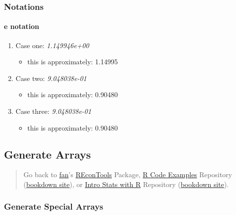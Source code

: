 \documentclass[
]{book}
\providecommand{\tightlist}{%
  \setlength{\itemsep}{0pt}\setlength{\parskip}{0pt}}
\begin{document}
\hypertarget{notations}{%
\subsubsection{Notations}\label{notations}}

\hypertarget{e-notation}{%
\paragraph{e notation}\label{e-notation}}

\begin{enumerate}
\def\labelenumi{\arabic{enumi}.}
\tightlist
\item
  Case one: \emph{1.149946e+00}

  \begin{itemize}
  \tightlist
  \item
    this is approximately: 1.14995
  \end{itemize}
\item
  Case two: \emph{9.048038e-01}

  \begin{itemize}
  \tightlist
  \item
    this is approximately: 0.90480
  \end{itemize}
\item
  Case three: \emph{9.048038e-01}

  \begin{itemize}
  \tightlist
  \item
    this is approximately: 0.90480
  \end{itemize}
\end{enumerate}

\hypertarget{generate-arrays}{%
\subsection{Generate Arrays}\label{generate-arrays}}

\begin{quote}
Go back to \href{http://fanwangecon.github.io/}{fan}'s \href{https://fanwangecon.github.io/REconTools/}{REconTools} Package, \href{https://fanwangecon.github.io/R4Econ/}{R Code Examples} Repository (\href{https://fanwangecon.github.io/R4Econ/bookdown}{bookdown site}), or \href{https://fanwangecon.github.io/Stat4Econ/}{Intro Stats with R} Repository (\href{https://fanwangecon.github.io/Stat4Econ/bookdown}{bookdown site}).
\end{quote}

\hypertarget{generate-special-arrays}{%
\subsubsection{Generate Special Arrays}\label{generate-special-arrays}}
\end{document}
